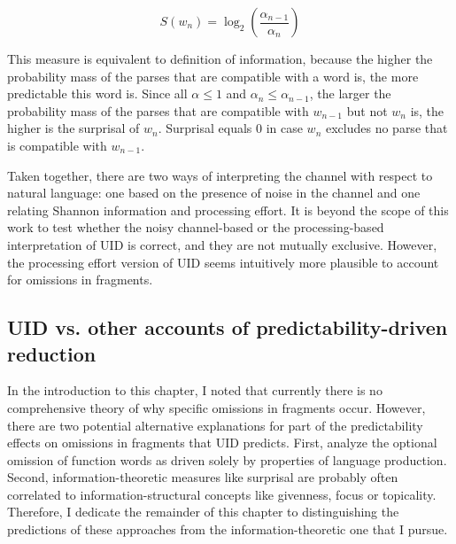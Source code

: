 \begin{equation}
 \displaystyle S(w_n) = \log_2 \left(\frac{\alpha_{n-1}}{\alpha_n}\right) \label{eq:surprisalhale}
\end{equation}

This measure is equivalent to  definition of information, because the higher the probability mass of the parses that are compatible with a word is, the more predictable this word is. Since all $\alpha\leq1$ and $\alpha_n\leq\alpha_{n-1}$, the larger the probability mass of the parses that are compatible with $w_{n-1}$ but not $w_n$ is, the higher is the surprisal of $w_n$. Surprisal equals 0 in case $w_n$ excludes no parse that is compatible with $w_{n-1}$.

Taken together, there are two ways of interpreting the channel with respect to natural language: one based on the presence of noise in the channel and one relating Shannon information and processing effort. It is beyond the scope of this work to test whether the noisy channel-based or the processing-based interpretation of UID is correct, and they are not mutually exclusive. However, the processing effort version of UID seems intuitively more plausible to account for omissions in fragments.

\subsection{UID vs. other accounts of predictability-driven reduction}
\label{sec:infotheory-uid-competing}
In the introduction to this chapter, I noted that currently there is no comprehensive theory of why specific omissions in fragments occur. However, there are two potential alternative explanations for part of the predictability effects on omissions in fragments that UID predicts. First, \citet{ferreira.dell2000} analyze the optional omission of function words as driven solely by properties of language production. Second, information-theoretic measures like surprisal are probably often correlated to information-structural concepts like givenness, focus or topicality. Therefore, I dedicate the remainder of this chapter to distinguishing the predictions of these approaches from the information-theoretic one that I pursue. 

